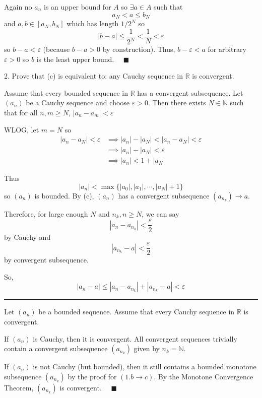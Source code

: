 \documentclass[12pt]{article}
\newcommand{\R}{\mathbb{R}}
\newcommand{\N}{\mathbb{N}}
\newcommand{\qed}{\quad \blacksquare}
\newcommand{\abs}[1]{\left\vert #1 \right\vert}
\newcommand{\ep}{\varepsilon}
\renewcommand{\div}{\vspace*{10pt}\hrule\vspace*{10pt}}
\begin{document}
    Again no $a_n$ is an upper bound for $A$ so $\exists a \in A$ such that 
    \[a_N < a \leq b_N\]
    and $a, b \in [a_N, b_N]$ which has length $1/2^N$ so 
    \[\abs{b - a} \leq \frac{1}{2^N} < \frac{1}{N} < \ep\] 
    so $b - a < \ep$ (because $b - a > 0$ by construction). Thus, $b - \ep < a$ for arbitrary $\ep > 0$ so $b$ is the least upper bound. $\qed$

\color{black} 

\pagebreak 

2. Prove that (c) is equivalent to: any Cauchy sequence in $\R$ is convergent.

\color{blue}
    Assume that every bounded sequence in $\R$ has a convergent subsequence. Let $(a_n)$ be a Cauchy sequence and choose $\ep > 0$. Then there exists $N \in \N$ such that for all $n, m \geq N$, $\abs{a_n - a_m} < \ep$

    WLOG, let $m = N$ so
    \begin{align*}
        \abs{a_n - a_N} < \ep &\implies \abs{a_n} - \abs{a_N} < \abs{a_n - a_N} < \ep\\
        &\implies \abs{a_n} - \abs{a_N} < \ep\\ 
        &\implies \abs{a_n} < 1 + \abs{a_N}
    \end{align*}

    
    Thus 
    \[\abs{a_n} < \max\{\abs{a_0}, \abs{a_1}, \cdots, \abs{a_N} + 1\}\]
    so $(a_n)$ is bounded. By (c), $(a_n)$ has a convergent subsequence $(a_{n_k})\to a$.
    
    Therefore, for large enough $N$ and $n_k, n \geq N$, we can say 
    \[\abs{a_n - a_{n_k}} < \frac{\ep}{2}\] 
    by Cauchy and 
    \[\abs{a_{n_k} - a} < \frac{\ep}{2}\]
    by convergent subsequence.

    So, 
    \[\abs{a_n - a} \leq \abs{a_n - a_{n_k}} + \abs{a_{n_k} - a} < \ep\]

    \div 

    Let $(a_n)$ be a bounded sequence. Assume that every Cauchy sequence in $\R$ is convergent.
    
    If $(a_n)$ is Cauchy, then it is convergent. All convergent sequences trivially contain a convergent subsequence $(a_{n_k})$ given by $n_k = \N$.

    If $(a_n)$ is not Cauchy (but bounded), then it still contains a bounded monotone subsequence $(a_{n_k})$ by the proof for $(1.b \to c)$. By the Monotone Convergence Theorem, $(a_{n_k})$ is convergent. $\qed$
    
\color{black}
\end{document}
